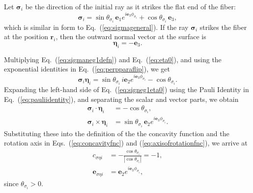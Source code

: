 \documentclass[a4paper,twocolumn,superscriptaddress]{revtex4-1}
\begin{document}
{Let $\bm  \sigma_i$ be the direction of the initial ray as it strikes the flat end of the fiber:
\begin{equation} 
  \label{eq:sigmaneg1defn}
  \bm  \sigma_i = 
  \sin  \theta_{ \sigma_i } \, \mathbf e_1 e^{ i \mathbf e_3 \phi_{ \sigma_i } } + 
  \cos \theta_{ \sigma_i } \, \mathbf e_3 ,
\end{equation}
which is similar in form to Eq.~(\ref{eq:sigmageneral}). If the ray $\bm  \sigma_i$ strikes 
the fiber at the position $\mathbf  r_i$, then the outward normal vector at the surface is
\begin{equation} 
  \label{eq:eta0}
  \bm  \eta_i = - \mathbf e_3 .
\end{equation}

Multiplying Eq.~(\ref{eq:sigmaneg1defn}) and Eq.~(\ref{eq:eta0}), and using the exponential 
identities in Eq.~(\ref{eq:perpparaflip}), we get
\begin{equation} 
  \label{eq:signeg1eta0}
  \bm  \sigma_i \bm  \eta_i 
  =  \sin \theta_{ \sigma_i } \, i \mathbf e_2 e^{ i \mathbf e_3 \phi_{ \sigma_i } } - 
  \cos \theta_{ \sigma_i } .
\end{equation}
Expanding the left-hand side of Eq.~(\ref{eq:signeg1eta0}) using the Pauli Identity in Eq.~(\ref{eq:pauliidentity}), and separating the scalar and vector parts, we obtain
\begin{subequations} 
  \label{eq:sigmaneg1pauli}
  \begin{align} 
    \label{eq:sigmaneg1dot} 
    \bm  \sigma_i \cdot \bm  \eta_i &= 
    -\cos \theta_{ \sigma_i } ,
    \\
    \label{eq:sigmaneg1cross} 
    \bm  \sigma_i \times \bm  \eta_i &= 
    \sin \theta_{ \sigma_i } \, \mathbf e_2 e^{ i \mathbf e_3 \phi_{ \sigma_i } } .
  \end{align}
\end{subequations}
Substituting these into the definition of the the concavity function  and the rotation 
axis in Eqs.~(\ref{eq:concavityfnc}) and (\ref{eq:axisofrotationfnc}), we arrive at
\begin{subequations}
  \label{eq:refractionparameteranser}
  \begin{align}
    \label{eq:concavityans}
    c_{\sigma \eta i} &= 
    - \frac{\cos \theta_{ \sigma_i }}{|\cos \theta_{ \sigma_i }|} = - 1 ,
    \\
    \label{eq:axisofrotationans}
    \mathbf e_{\sigma \eta i} &= 
    \mathbf e_2 e^{i \mathbf e_3 \phi_{ \sigma_i }} ,
  \end{align}
\end{subequations}
since $\theta_{ \sigma_i } > 0$.

}
\end{document}

